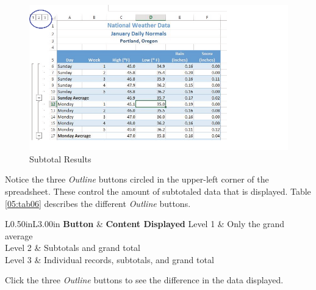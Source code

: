 \begin{figure}[H]
	\centering
	\includegraphics[width=\maxwidth{.95\linewidth}]{gfx/ch05_fig25}
	\caption{Subtotal Results}
	\label{05:fig25}
\end{figure}

Notice the three \textit{Outline} buttons circled in the upper-left corner of the spreadsheet. These control the amount of subtotaled data that is displayed. Table \ref{05:tab06} describes the different \textit{Outline} buttons.

\begin{table}[H]
	{\small
		\begin{longtable}{L{0.50in}L{3.00in}} %
			\textbf{Button} & \textbf{Content Displayed} \endhead
			\hline
			Level 1 & Only the grand average\\
			Level 2 & Subtotals and grand total\\
			Level 3 & Individual records, subtotals, and grand total\\
			\caption{Subtotal Outline Buttons}
			\label{05:tab06}
		\end{longtable}
	} %
\end{table}

Click the three \textit{Outline} buttons to see the difference in the data displayed.

